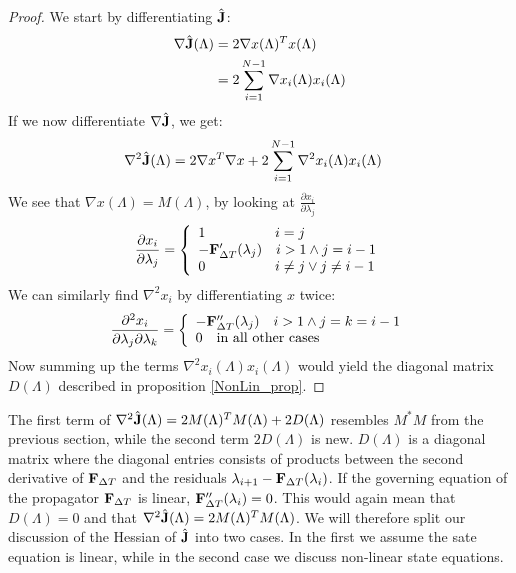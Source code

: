 \documentclass[11pt,a4paper]{article}
\begin{document}
\begin{proof}
We start by differentiating $\hat{\bold J}$:
\begin{align*}
\nabla \hat{\bold J}(\Lambda) &= 2 \nabla x(\Lambda)^T x(\Lambda)\\
&=2\sum_{i=1}^{N-1} \nabla x_i(\Lambda) x_i(\Lambda)
\end{align*}
If we now differentiate $\nabla \hat{\bold J}$, we get:
\begin{align*}
\nabla^2 \hat{\bold J}(\Lambda) &= 2\nabla x^T\nabla x + 2\sum_{i=1}^{N-1} \nabla^2 x_i(\Lambda) x_i(\Lambda)
\end{align*}
We see that $\nabla x(\Lambda)=M(\Lambda)$, by looking at $\frac{\partial x_i}{\partial \lambda_j}$
\begin{align*}
\frac{\partial x_i}{\partial \lambda_j} = \left\{
     \begin{array}{lr}
		1 \quad\quad\quad\quad\quad i=j\\
		-\bold F_{\Delta T}'(\lambda_{j}) \quad i>1 \wedge j=i-1 \\
		0 \quad\quad\quad\quad\quad i\neq j \vee j\neq i-1
	\end{array}
   \right.	
\end{align*}
We can similarly find $\nabla^2 x_i$ by differentiating $x$ twice:
\begin{align*}
\frac{\partial^2 x_i}{\partial \lambda_j\partial\lambda_k} = \left\{
     \begin{array}{lr}
		-\bold F_{\Delta T}''(\lambda_{j}) \quad i>1 \wedge j=k=i-1 \\
		0 \quad\textrm{in all other cases}
	\end{array}
   \right.	
\end{align*}
Now summing up the terms $\nabla^2 x_i(\Lambda)x_i(\Lambda)$ would yield the diagonal matrix $D(\Lambda)$ described in proposition \ref{NonLin_prop}.
\end{proof}
The first term of $\nabla^2 \hat{\bold J}(\Lambda)=2M(\Lambda)^TM(\Lambda) + 2D(\Lambda)$ resembles $M^*M$ from the previous section, while the second term $2D(\Lambda)$ is new. $D(\Lambda)$ is a diagonal matrix where the diagonal entries consists of products between the second derivative of $\bold F_ {\Delta T}$ and the residuals $\lambda_{i+1}-\bold F_{\Delta T}(\lambda_i)$. If the governing equation of the propagator $\bold F_ {\Delta T}$ is linear, $\bold F_{\Delta T}''(\lambda_i)=0$. This would again mean that $D(\Lambda)=0$ and that $\nabla^2 \hat{\bold J}(\Lambda)=2M(\Lambda)^TM(\Lambda)$. We will therefore split our discussion of the Hessian of $\hat{\bold J}$ into two cases. In the first we assume the sate equation is linear, while in the second case we discuss non-linear state equations.
\end{document}
